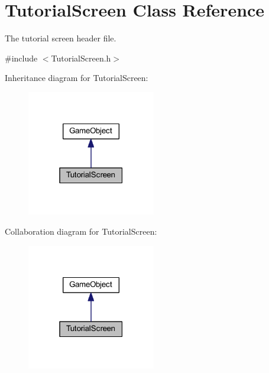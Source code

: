 \hypertarget{class_tutorial_screen}{\section{Tutorial\+Screen Class Reference}
\label{class_tutorial_screen}
}


The tutorial screen header file.  




{\ttfamily \#include $<$Tutorial\+Screen.\+h$>$}



Inheritance diagram for Tutorial\+Screen\+:\nopagebreak
\begin{figure}[H]
\begin{center}
\leavevmode
\includegraphics[width=159pt]{class_tutorial_screen__inherit__graph}
\end{center}
\end{figure}


Collaboration diagram for Tutorial\+Screen\+:\nopagebreak
\begin{figure}[H]
\begin{center}
\leavevmode
\includegraphics[width=159pt]{class_tutorial_screen__coll__graph}
\end{center}
\end{figure}
